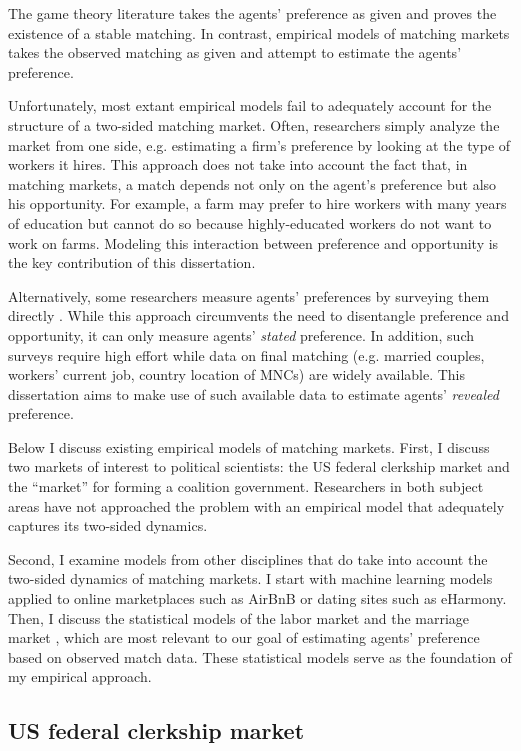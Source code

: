 The game theory literature takes the agents' preference as given and proves the
existence of a stable matching. In contrast, empirical models of matching
markets takes the observed matching as given and attempt to estimate the agents' preference.

Unfortunately, most extant empirical models fail to adequately account for the
structure of a two-sided matching market. Often, researchers simply analyze the
market from one side, e.g. estimating a firm's preference by looking at the type
of workers it hires. This approach does not take into account the fact that, in
matching markets, a match depends not only on the agent's preference but also
his opportunity. For example, a farm may prefer to hire workers with many years
of education but cannot do so because highly-educated workers do not want to
work on farms. Modeling this interaction between preference and opportunity is
the key contribution of this dissertation.

Alternatively, some researchers measure agents' preferences by surveying them
directly \citep{Posner2001, Sprecher1994}. While this approach circumvents the
need to disentangle preference and opportunity, it can only measure agents'
\textit{stated} preference. In addition, such surveys require high effort while data on
final matching (e.g. married couples, workers' current job, country location of
MNCs) are widely available. This dissertation aims to make use of such available
data to estimate agents' \textit{revealed} preference.

Below I discuss existing empirical models of matching markets. First, I discuss two
markets of interest to political scientists: the US federal clerkship market and
the ``market'' for forming a coalition government. Researchers in both subject
areas have not approached the problem with an empirical model that adequately
captures its two-sided dynamics.

Second, I examine models from other disciplines that do take into account the
two-sided dynamics of matching markets. I start with machine learning models
applied to online marketplaces such as AirBnB or dating sites such as eHarmony.
Then, I discuss the statistical models of the labor market \citep{Logan1996} and the marriage
market \citep{Logan2008}, which are most relevant to our goal of estimating agents' preference
based on observed match data. These statistical models serve as the foundation
of my empirical approach.

\subsection{US federal clerkship market}


